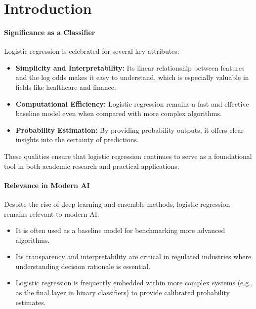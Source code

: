 \documentclass[12pt]{article}
\begin{document}
\section{Introduction}
\paragraph{Significance as a Classifier} Logistic regression is celebrated for several key attributes:
\begin{itemize}
    \item \textbf{Simplicity and Interpretability:} Its linear relationship between features and the log odds makes it easy to understand, which is especially valuable in fields like healthcare and finance.
    \item \textbf{Computational Efficiency:} Logistic regression remains a fast and effective baseline model even when compared with more complex algorithms.
    \item \textbf{Probability Estimation:} By providing probability outputs, it offers clear insights into the certainty of predictions.
\end{itemize}
These qualities ensure that logistic regression continues to serve as a foundational tool in both academic research and practical applications.
 

\paragraph{Relevance in Modern AI}
Despite the rise of deep learning and ensemble methods, logistic regression remains relevant to modern AI:
\begin{itemize}
    \item It is often used as a baseline model for benchmarking more advanced algorithms.
    \item Its transparency and interpretability are critical in regulated industries where understanding decision rationale is essential.
    \item Logistic regression is frequently embedded within more complex systems (e.g., as the final layer in binary classifiers) to provide calibrated probability estimates.
\end{itemize}
\end{document}
